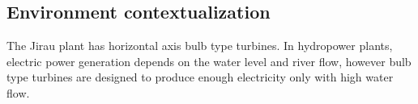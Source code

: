 \subsection{Environment contextualization}\label{sec::desc_contex}

The Jirau plant has horizontal axis bulb type turbines. In hydropower
plants, electric power generation depends on the water level and river flow,
however bulb type turbines are designed to produce enough electricity only with
high water flow. %
 



